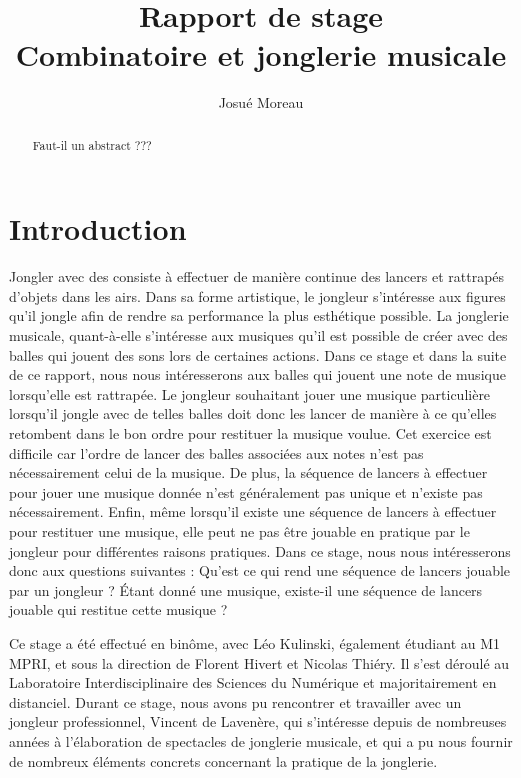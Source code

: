 \documentclass[a4paper]{easychair}
\begin{document}
\title{Rapport de stage\\\large{Combinatoire et jonglerie musicale}}
\titlerunning{}
\author{Josué Moreau}
\authorrunning{}
\institute{}
\maketitle

\begin{abstract}
  Faut-il un abstract ???
\end{abstract}

\section{Introduction}
Jongler avec des consiste à effectuer de manière continue des lancers et
rattrapés d'objets dans les airs. Dans sa forme artistique, le jongleur
s'intéresse aux figures qu'il jongle afin de rendre sa performance la plus
esthétique possible. La jonglerie musicale, quant-à-elle s'intéresse aux
musiques qu'il est possible de créer avec des balles qui jouent des sons lors de
certaines actions. Dans ce stage et dans la suite de ce rapport, nous nous
intéresserons aux balles qui jouent une note de musique lorsqu'elle est
rattrapée. Le jongleur souhaitant jouer une musique particulière lorsqu'il
jongle avec de telles balles doit donc les lancer de manière à ce qu'elles
retombent dans le bon ordre pour restituer la musique voulue. Cet exercice est
difficile car l'ordre de lancer des balles associées aux notes n'est pas
nécessairement celui de la musique. De plus, la séquence de lancers à effectuer
pour jouer une musique donnée n'est généralement pas unique et n'existe pas
nécessairement. Enfin, même lorsqu'il existe une séquence de lancers à effectuer
pour restituer une musique, elle peut ne pas être jouable en pratique par le
jongleur pour différentes raisons pratiques. Dans ce stage, nous nous
intéresserons donc aux questions suivantes : Qu'est ce qui rend une séquence de
lancers jouable par un jongleur ? Étant donné une musique, existe-il une
séquence de lancers jouable qui restitue cette musique ?

Ce stage a été effectué en binôme, avec Léo Kulinski, également étudiant au M1
MPRI, et sous la direction de Florent Hivert et Nicolas Thiéry. Il s'est déroulé
au Laboratoire Interdisciplinaire des Sciences du Numérique et majoritairement
en distanciel. Durant ce stage, nous avons pu rencontrer et travailler avec un
jongleur professionnel, Vincent de Lavenère, qui s'intéresse depuis de
nombreuses années à l'élaboration de spectacles de jonglerie musicale, et qui a
pu nous fournir de nombreux éléments concrets concernant la pratique de la
jonglerie.
\end{document}
